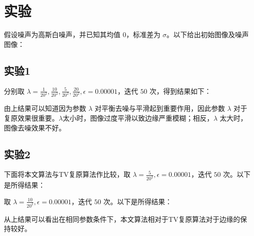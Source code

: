 \section{实验}
假设噪声为高斯白噪声，并已知其均值 $0$，标准差为 $\sigma$。以下给出初始图像及噪声图像：
\begin{figure}[H]
\centering
\subfigure[原始图像]{\label{figure:001} \texttt{[image: 001]}}
\subfigure[噪声图像（$\mu=0,\sigma=20$)]{\label{figure:002} \texttt{[image: 002]}}
\end{figure}
\subsection{实验1}
分别取 $\lambda=\frac{1}{20^2},\frac{10}{20^2},\frac{5}{20^2},\frac{20}{20^2},\epsilon=0.00001$，迭代 $50$ 次，得到结果如下：
\begin{figure}[H]
\centering
\subfigure[$\lambda=\frac{1}{20^2}$]{\label{figure:1/20} \texttt{[image: 003]}}
\subfigure[$\lambda=\frac{5}{20^2}$]{\label{figure:5/20} \texttt{[image: 004]}}
\subfigure[$\lambda=\frac{10}{20^2}$]{\label{figure:10/20} \texttt{[image: 005]}}
\subfigure[$\lambda=\frac{20}{20^2}$]{\label{figure:20/20} \texttt{[image: 006]}}
\end{figure}
由上结果可以知道因为参数 $\lambda$ 对平衡去噪与平滑起到重要作用，因此参数 $\lambda$ 对于复原效果很重要。$\lambda$太小时，图像过度平滑以致边缘严重模糊；相反，$\lambda$ 太大时，图像去噪效果不好。
\subsection{实验2}
下面将本文算法与TV复原算法作比较，取 $\lambda=\frac{5}{20^2},\epsilon=0.00001$，迭代 $50$ 次。以下是所得结果：
\begin{figure}[H]
\centering
\subfigure[本文算法所得结果]{\label{figure:1/2} \texttt{[image: 007]}}
\subfigure[TV复原算法所得结果]{\label{figure:1} \texttt{[image: 008]}}
\end{figure}
取 $\lambda=\frac{10}{20^2},\epsilon=0.00001$，迭代 $50$ 次。以下是所得结果：
\begin{figure}[H]
\centering
\subfigure[本文算法所得结果]{\label{figure:1/2} \texttt{[image: 009]}}
\subfigure[TV复原算法所得结果]{\label{figure:1} \texttt{[image: 010]}}
\end{figure}
从上结果可以看出在相同参数条件下，本文算法相对于TV复原算法对于边缘的保持较好。



